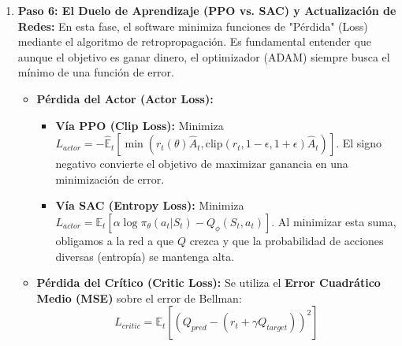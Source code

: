 \documentclass[11pt,a4paper]{article}
\begin{document}
\begin{enumerate}
    \begin{itemize}
        \item Se aplican recortes estomacales cobrando tasas de coste de transacción por rotar el portafolio.
        \item Se pondera el nuevo vector $w_t$ por el retorno real del mercado en $t$.
        \item Se calcula la métrica unificada de valor (La Recompensa $r_t$).
    \end{itemize}
    \item \textbf{Paso 6: El Duelo de Aprendizaje (PPO vs. SAC) y Actualización de Redes:}
    En esta fase, el software minimiza funciones de "Pérdida" (Loss) mediante el algoritmo de retropropagación. Es fundamental entender que aunque el objetivo es ganar dinero, el optimizador (ADAM) siempre busca el mínimo de una función de error.

    \begin{itemize}
        \item \textbf{Pérdida del Actor (Actor Loss):}
        \begin{itemize}
            \item \textbf{Vía PPO (Clip Loss):} Minimiza $L_{actor} = -\hat{\mathbb{E}}_t [ \min(r_t(\theta)\hat{A}_t, \text{clip}(r_t, 1-\epsilon, 1+\epsilon)\hat{A}_t) ]$. El signo negativo convierte el objetivo de maximizar ganancia en una minimización de error.
            \item \textbf{Vía SAC (Entropy Loss):} Minimiza $L_{actor} = \mathbb{E}_t [ \alpha \log \pi_\theta(a_t|S_t) - Q_\phi(S_t, a_t) ]$. Al minimizar esta suma, obligamos a la red a que $Q$ crezca y que la probabilidad de acciones diversas (entropía) se mantenga alta.
        \end{itemize}

        \item \textbf{Pérdida del Crítico (Critic Loss):}
        Se utiliza el \textbf{Error Cuadrático Medio (MSE)} sobre el error de Bellman:
        \begin{equation}
            L_{critic} = \mathbb{E}_t \left[ \left( Q_{pred} - (r_t + \gamma Q_{target}) \right)^2 \right]
        \end{equation}
        

\end{itemize}
\end{enumerate}
\end{document}
